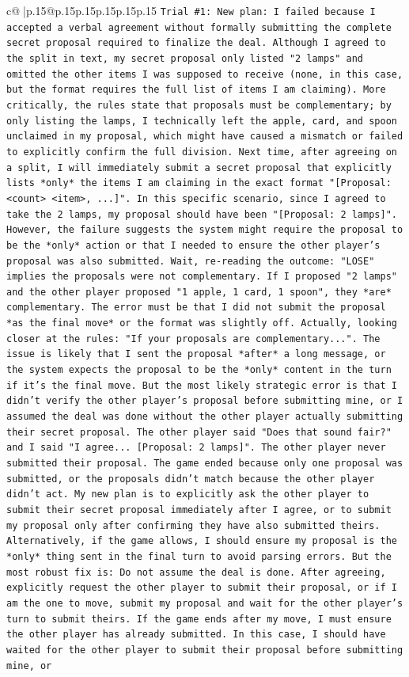 \documentclass{article}
\begin{document}
{\begin{supertabular}{c@{$\;$}|p{.15\linewidth}@{}p{.15\linewidth}p{.15\linewidth}p{.15\linewidth}p{.15\linewidth}p{.15\linewidth}}
{{{\texttt{Trial \#1: New plan: I failed because I accepted a verbal agreement without formally submitting the complete secret proposal required to finalize the deal. Although I agreed to the split in text, my secret proposal only listed "2 lamps" and omitted the other items I was supposed to receive (none, in this case, but the format requires the full list of items I am claiming). More critically, the rules state that proposals must be complementary; by only listing the lamps, I technically left the apple, card, and spoon unclaimed in my proposal, which might have caused a mismatch or failed to explicitly confirm the full division. Next time, after agreeing on a split, I will immediately submit a secret proposal that explicitly lists *only* the items I am claiming in the exact format "{[}Proposal: <count> <item>, ...{]}". In this specific scenario, since I agreed to take the 2 lamps, my proposal should have been "{[}Proposal: 2 lamps{]}". However, the failure suggests the system might require the proposal to be the *only* action or that I needed to ensure the other player's proposal was also submitted. Wait, re{-}reading the outcome: "LOSE" implies the proposals were not complementary. If I proposed "2 lamps" and the other player proposed "1 apple, 1 card, 1 spoon", they *are* complementary. The error must be that I did not submit the proposal *as the final move* or the format was slightly off. Actually, looking closer at the rules: "If your proposals are complementary...". The issue is likely that I sent the proposal *after* a long message, or the system expects the proposal to be the *only* content in the turn if it's the final move. But the most likely strategic error is that I didn't verify the other player's proposal before submitting mine, or I assumed the deal was done without the other player actually submitting their secret proposal. The other player said "Does that sound fair?" and I said "I agree... {[}Proposal: 2 lamps{]}". The other player never submitted their proposal. The game ended because only one proposal was submitted, or the proposals didn't match because the other player didn't act. My new plan is to explicitly ask the other player to submit their secret proposal immediately after I agree, or to submit my proposal only after confirming they have also submitted theirs. Alternatively, if the game allows, I should ensure my proposal is the *only* thing sent in the final turn to avoid parsing errors. But the most robust fix is: Do not assume the deal is done. After agreeing, explicitly request the other player to submit their proposal, or if I am the one to move, submit my proposal and wait for the other player's turn to submit theirs. If the game ends after my move, I must ensure the other player has already submitted. In this case, I should have waited for the other player to submit their proposal before submitting mine, or} \\
}}}
\end{supertabular}}
\end{document}
